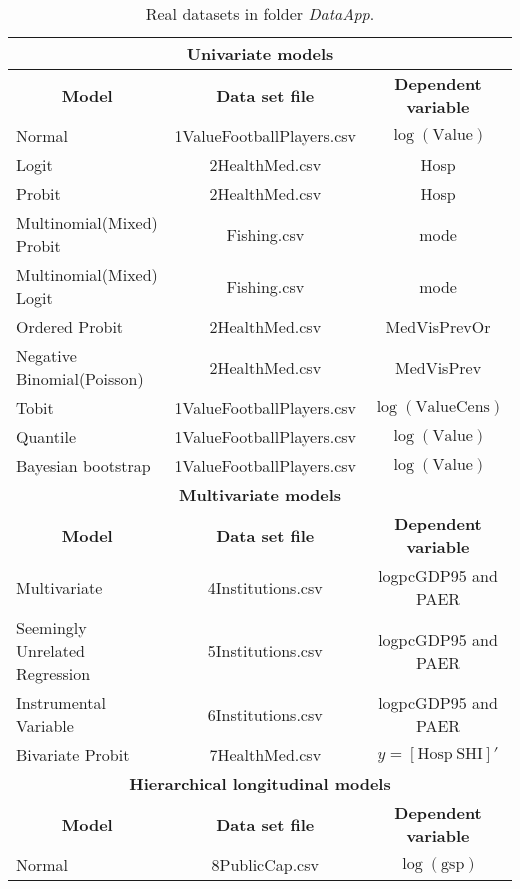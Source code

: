 \begin{table}[!ht]
	\begin{center}
	\caption{Real datasets in folder \textit{DataApp}.} \label{tab:appdata}
	{{
	\begin{tabular}{|l|c|c|}
	\hline 
	\multicolumn{3}{|c|}{\textbf{Univariate models}} \\
	\hline  
	 \multicolumn{1}{|c|}{\textbf{Model}} & \multicolumn{1}{c}{\textbf{Data set file}} & \multicolumn{1}{|c|}{\textbf{Dependent variable}} \\ 
	 \hline 
	Normal & 1ValueFootballPlayers.csv & $\log(\text{Value})$ \\
	Logit & 2HealthMed.csv & Hosp\\
	Probit & 2HealthMed.csv & Hosp \\
	Multinomial(Mixed) Probit  & Fishing.csv & mode \\
	Multinomial(Mixed) Logit  & Fishing.csv & mode \\
	Ordered Probit  &  2HealthMed.csv & MedVisPrevOr\\
	Negative Binomial(Poisson)   & 2HealthMed.csv & MedVisPrev\\
	Tobit   & 1ValueFootballPlayers.csv & $\log(\text{ValueCens})$ \\
	Quantile &  1ValueFootballPlayers.csv & $\log(\text{Value})$ \\
	Bayesian bootstrap & 1ValueFootballPlayers.csv & $\log(\text{Value})$  \\
	\hline 
	\multicolumn{3}{|c|}{\textbf{Multivariate models}} \\
	\hline  
	\multicolumn{1}{|c|}{\textbf{Model}} & \multicolumn{1}{c}{\textbf{Data set file}} & \multicolumn{1}{|c|}{\textbf{Dependent variable}}\\ 
	\hline
	Multivariate   & 4Institutions.csv & logpcGDP95 and PAER \\
	Seemingly Unrelated Regression & 5Institutions.csv & logpcGDP95 and PAER\\
	Instrumental Variable  & 6Institutions.csv & logpcGDP95 and PAER \\
	Bivariate Probit   & 7HealthMed.csv & $y=\left[\text{Hosp} \ \text{SHI}\right]'$\\
	\hline
	\multicolumn{3}{|c|}{\textbf{Hierarchical longitudinal models}} \\
	\hline  
	\multicolumn{1}{|c|}{\textbf{Model}} & \multicolumn{1}{c}{\textbf{Data set file}} & \multicolumn{1}{|c|}{\textbf{Dependent variable}} \\ 
	\hline
	Normal & 8PublicCap.csv  & $\log(\text{gsp})$ \\

\end{tabular}}}
\end{center}
\end{table}
